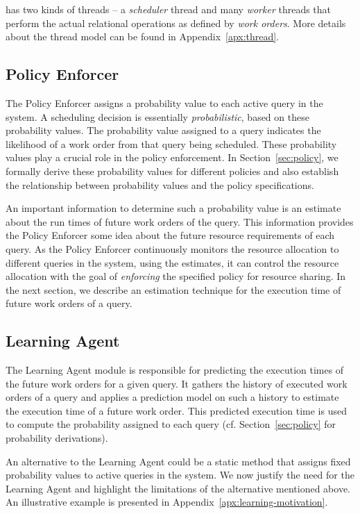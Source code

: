\sys{} has two kinds of threads -- a \textit{scheduler} thread and many \textit{worker} threads that perform the actual relational operations as defined by \textit{work orders}. 
More details about the thread model can be found in Appendix~\ref{apx:thread}.

\subsection{Policy Enforcer}\label{ssec:policy-enforcer}
The Policy Enforcer assigns a probability value to each active query in the system. 
A scheduling decision is essentially \textit{probabilistic}, based on these probability values. 
The probability value assigned to a query indicates the likelihood of a work order from that query being scheduled. 
These probability values play a crucial role in the policy enforcement.
In Section~\ref{sec:policy}, we formally derive these probability values for different policies and also establish the relationship between probability values and the policy specifications.

An important information to determine such a probability value is an estimate about the run times of future work orders of the query.
This information provides the Policy Enforcer some idea about the future resource requirements of each query.
As the Policy Enforcer continuously monitors the resource allocation to different queries in the system, using the estimates, it can control the resource allocation with the goal of \textit{enforcing} the specified policy for resource sharing. 
In the next section, we describe an estimation technique for the execution time of future work orders of a query.
\subsection{Learning Agent}\label{ssec:learning}
The Learning Agent module is responsible for predicting the execution times of the future work orders for a given query. 
It gathers the history of executed work orders of a query and applies a prediction model on such a history to estimate the execution time of a future work order.
This predicted execution time is used to compute the probability assigned to each query (cf. Section~\ref{sec:policy} for probability derivations).

An alternative to the Learning Agent could be a static method that assigns fixed probability values to active queries in the system. 
We now justify the need for the Learning Agent and highlight the limitations of the alternative mentioned above.
An illustrative example is presented in Appendix~\ref{apx:learning-motivation}.

